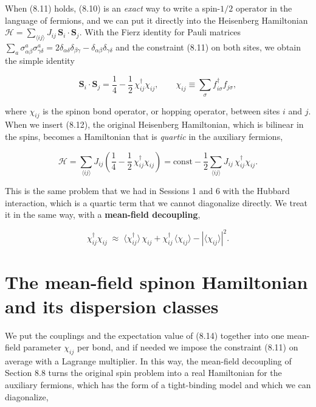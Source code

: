 When (8.11) holds, (8.10) is an \emph{exact} way to write a spin-$1/2$ operator in the language of
fermions, and we can put it directly into the Heisenberg Hamiltonian $\mathcal H=\sum_{\langle
ij\rangle}J_{ij}\,\mathbf S_i\cdot\mathbf S_j$. With the Fierz identity for Pauli matrices
$\sum_a \sigma^a_{\alpha\beta}\sigma^a_{\gamma\delta} = 2\delta_{\alpha\delta}\delta_{\beta\gamma} -
\delta_{\alpha\beta}\delta_{\gamma\delta}$ and the constraint (8.11) on both sites, we obtain the
simple identity

\begin{equation}
\mathbf S_i \cdot \mathbf S_j = \frac14 - \frac12\, \chi_{ij}^\dagger \chi_{ij}, \qquad \chi_{ij}
\equiv \sum_\sigma f_{i\sigma}^\dagger f_{j\sigma},
\end{equation}

where $\chi_{ij}$ is the spinon bond operator, or hopping operator, between sites $i$ and $j$. When
we insert (8.12), the original Heisenberg Hamiltonian, which is bilinear in the spins, becomes a
Hamiltonian that is \emph{quartic} in the auxiliary fermions,

\begin{equation}
\mathcal H = \sum_{\langle ij\rangle} J_{ij}\left(\frac14 - \frac12\,\chi_{ij}^\dagger\chi_{ij}\right)
= \text{const} - \frac12\sum_{\langle ij\rangle} J_{ij}\, \chi_{ij}^\dagger \chi_{ij}.
\end{equation}

This is the same problem that we had in Sessions 1 and 6 with the Hubbard interaction,
which is a quartic term that we cannot diagonalize directly. We treat
it in the same way, with a \textbf{mean-field decoupling},

\begin{equation}
\chi_{ij}^\dagger\chi_{ij} \;\approx\; \langle\chi_{ij}^\dagger\rangle\,\chi_{ij} +
\chi_{ij}^\dagger\,\langle\chi_{ij}\rangle - |\langle\chi_{ij}\rangle|^2.
\end{equation}

\section{The mean-field spinon Hamiltonian and its dispersion classes}

We put the couplings and the expectation value of (8.14) together into one mean-field parameter
$\chi_{ij}$ per bond, and if needed we impose the constraint (8.11) on average with a Lagrange
multiplier. In this way, the mean-field decoupling of Section 8.8 turns the original spin problem
into a real Hamiltonian for the auxiliary fermions, which has the form of a tight-binding model and
which we can diagonalize,

